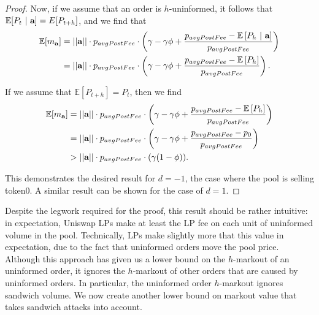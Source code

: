 \begin{proof}
        Now, if we assume that an order is $h$-uninformed, it follows that $\mathbb E[P_{t} \ | \ \textbf a] = E[P_{t+h}]$, and we find that
            \begin{align*}
                \mathbb E[m_\textbf a]
                    & = ||\textbf{a}|| \cdot p_{avgPostFee} \cdot \left( \gamma - \gamma \phi + \frac{p_{avgPostFee} - \mathbb E \left[P_{h} \ | \ \textbf a \right]}{p_{avgPostFee}} \right) \\
                    & = ||\textbf{a}|| \cdot p_{avgPostFee} \cdot \left( \gamma - \gamma \phi + \frac{p_{avgPostFee} - \mathbb E \left[ P_{h} \right]}{p_{avgPostFee}} \right).
            \end{align*}

        If we assume that $\mathbb E[P_{t+h}] = P_t$, then we find 
            \begin{align*}
                \mathbb E[m_\textbf a]
                    & = ||\textbf{a}|| \cdot p_{avgPostFee} \cdot \left( \gamma - \gamma \phi + \frac{p_{avgPostFee} - \mathbb E \left[ P_{h} \right]}{p_{avgPostFee}} \right) \\
                    & = ||\textbf{a}|| \cdot p_{avgPostFee} \cdot \left( \gamma - \gamma \phi + \frac{p_{avgPostFee} - p_0}{p_{avgPostFee}} \right) \\
                    & > ||\textbf{a}|| \cdot p_{avgPostFee} \cdot (\gamma(1-\phi)).
            \end{align*}

        This demonstrates the desired result for $d=-1$, the case where the pool is selling token0. A similar result can be shown for the case of $d=1$.
    \end{proof}

    Despite the legwork required for the proof, this result should be rather intuitive: in expectation, Uniswap LPs make at least the LP fee on each unit of uninformed volume in the pool. Technically, LPs make slightly more that this value in expectation, due to the fact that uninformed orders move the pool price. Although this approach has given us a lower bound on the $h$-markout of an uninformed order, it ignores the $h$-markout of other orders that are caused by uninformed orders. In particular, the uninformed order $h$-markout ignores sandwich volume. We now create another lower bound on markout value that takes sandwich attacks into account.
        
    
